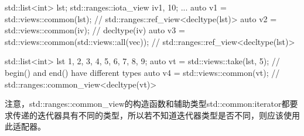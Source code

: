 \begin{cpp}
std::list<int> lst;
std::ranges::iota_view iv{1, 10};
...
auto v1 = std::views::common(lst); // std::ranges::ref_view<decltype(lst)>
auto v2 = std::views::common(iv); // decltype(iv)
auto v3 = std::views::common(std::views::all(vec));
			// std::ranges::ref_view<decltype(lst)>
			
std::list<int> lst {1, 2, 3, 4, 5, 6, 7, 8, 9};
auto vt = std::views::take(lst, 5); // begin() and end() have different types
auto v4 = std::views::common(vt); // std::ranges::common_view<decltype(vt)>
\end{cpp}

注意，std::ranges::common\_view的构造函数和辅助类型std::common:iterator都要求传递的迭代器具有不同的类型，所以若不知道迭代器类型是否不同，则应该使用此适配器。











